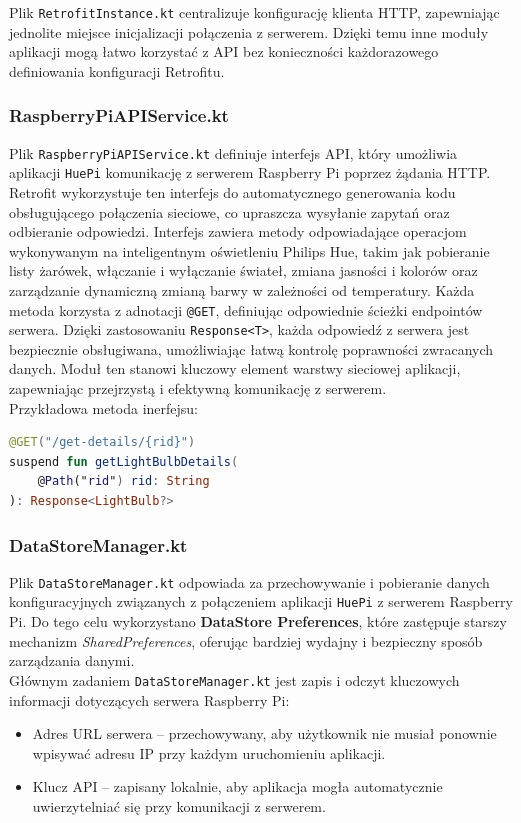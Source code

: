 \documentclass[12pt]{article}
\begin{document}
Plik \texttt{RetrofitInstance.kt} centralizuje konfigurację klienta HTTP, zapewniając jednolite miejsce inicjalizacji połączenia z serwerem. Dzięki temu inne moduły aplikacji mogą łatwo
korzystać z API bez konieczności każdorazowego definiowania konfiguracji Retrofitu.


\subsubsection{RaspberryPiAPIService.kt}
Plik \texttt{RaspberryPiAPIService.kt} definiuje interfejs API, który umożliwia aplikacji \texttt{HuePi} komunikację z serwerem Raspberry Pi poprzez żądania HTTP. Retrofit wykorzystuje 
ten interfejs do automatycznego generowania kodu obsługującego połączenia sieciowe, co upraszcza wysyłanie zapytań oraz odbieranie odpowiedzi.
Interfejs zawiera metody odpowiadające operacjom wykonywanym na inteligentnym oświetleniu Philips Hue, takim jak pobieranie listy żarówek, włączanie i wyłączanie świateł, zmiana jasności
i kolorów oraz zarządzanie dynamiczną zmianą barwy w zależności od temperatury. Każda metoda korzysta z adnotacji \texttt{@GET}, definiując odpowiednie ścieżki endpointów serwera.
Dzięki zastosowaniu \texttt{Response<T>}, każda odpowiedź z serwera jest bezpiecznie obsługiwana, umożliwiając łatwą kontrolę poprawności zwracanych danych. Moduł ten stanowi kluczowy
element warstwy sieciowej aplikacji, zapewniając przejrzystą i efektywną komunikację z serwerem.\\
Przykładowa metoda inerfejsu:
\begin{lstlisting}[language=Kotlin]
@GET("/get-details/{rid}")
suspend fun getLightBulbDetails(
    @Path("rid") rid: String
): Response<LightBulb?>
\end{lstlisting}


\subsubsection{DataStoreManager.kt}
Plik \texttt{DataStoreManager.kt} odpowiada za przechowywanie i pobieranie danych konfiguracyjnych związanych z połączeniem aplikacji \texttt{HuePi} z serwerem Raspberry Pi. Do tego celu
wykorzystano \textbf{DataStore Preferences}, które zastępuje starszy mechanizm \textit{SharedPreferences}, oferując bardziej wydajny i bezpieczny sposób zarządzania danymi.\\
Głównym zadaniem \texttt{DataStoreManager.kt} jest zapis i odczyt kluczowych informacji dotyczących serwera Raspberry Pi:
\begin{itemize}
    \item Adres URL serwera – przechowywany, aby użytkownik nie musiał ponownie wpisywać adresu IP przy każdym uruchomieniu aplikacji.
    \item Klucz API – zapisany lokalnie, aby aplikacja mogła automatycznie uwierzytelniać się przy komunikacji z serwerem.
\end{itemize}
\end{document}
